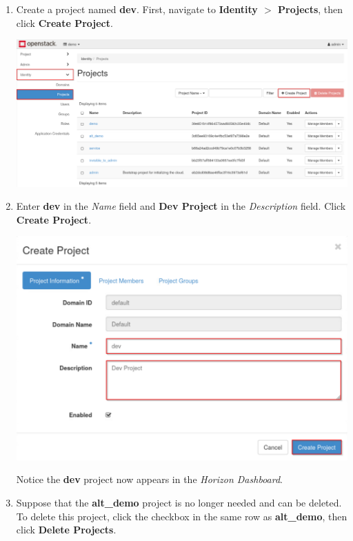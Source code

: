 \documentclass[letterpaper, 12pt]{article}
\begin{document}
\begin{enumerate}
    \item Create a project named \textbf{dev}.
    First, navigate to \textbf{Identity $>$ Projects}, then click
    \textbf{Create Project}.

    \begin{center}
        \includegraphics[width=\linewidth]{images/part1/step5.png}
    \end{center}

    \item Enter \textbf{dev} in the \textit{Name} field and \textbf{Dev Project} in the \textit{Description} field.
    Click \textbf{Create Project}.

    \begin{center}
        \includegraphics[width=\linewidth]{images/part1/step6.png}
    \end{center}

    \begin{notebox}
        Notice the \textbf{dev} project now appears in the \textit{Horizon Dashboard}.
    \end{notebox}

    \item Suppose that the \textbf{alt\_demo} project is no longer needed and can be deleted.
    To delete this project, click the checkbox in the same row as \textbf{alt\_demo}, then click \textbf{Delete Projects}.


\end{enumerate}
\end{document}
